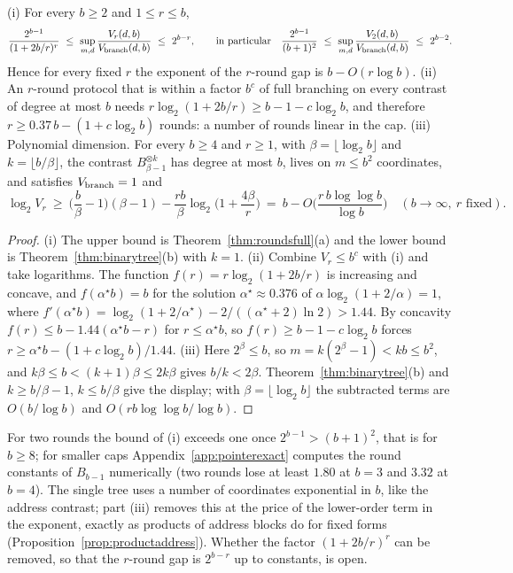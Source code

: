\begin{corollary}\label{cor:fewrounds}
\textup{(i)} For every $b\ge2$ and $1\le r\le b$,
\[
 \frac{2^{b-1}}{(1+2b/r)^{r}}\ \le\ \sup_{m,d}\frac{V_r(d,b)}{V_{\rm branch}(d,b)}\ \le\ 2^{b-r},
 \qquad\text{in particular}\quad
 \frac{2^{b-1}}{(b+1)^2}\ \le\ \sup_{m,d}\frac{V_2(d,b)}{V_{\rm branch}(d,b)}\ \le\ 2^{b-2}.
\]
Hence for every fixed $r$ the exponent of the $r$-round gap is $b-O(r\log b)$.
\textup{(ii)} An $r$-round protocol that is within a factor $b^{c}$ of full
branching on every contrast of degree at most $b$ needs
$r\log_2(1+2b/r)\ge b-1-c\log_2b$, and therefore $r\ge0.37\,b-(1+c\log_2b)$
rounds: a number of rounds linear in the cap.
\textup{(iii)} Polynomial dimension. For every $b\ge4$ and $r\ge1$, with
$\beta=\lfloor\log_2b\rfloor$ and $k=\lfloor b/\beta\rfloor$, the contrast
$B_{\beta-1}^{\otimes k}$ has degree at most $b$, lives on $m\le b^2$
coordinates, and satisfies $V_{\rm branch}=1$ and
\[
 \log_2V_r\ \ge\ \Big(\frac b\beta-1\Big)(\beta-1)-\frac{rb}{\beta}\log_2\Big(1+\frac{4\beta}{r}\Big)
 \ =\ b-O\Big(\frac{r\,b\log\log b}{\log b}\Big)\quad(b\to\infty,\ r\text{ fixed}).
\]
\end{corollary}
\begin{proof}
(i) The upper bound is Theorem~\ref{thm:roundsfull}(a) and the lower bound is
Theorem~\ref{thm:binarytree}(b) with $k=1$. (ii) Combine $V_r\le b^c$ with
(i) and take logarithms. The function $f(r)=r\log_2(1+2b/r)$ is increasing
and concave, and $f(\alpha^\star b)=b$ for the solution
$\alpha^\star\approx0.376$ of $\alpha\log_2(1+2/\alpha)=1$, where
$f'(\alpha^\star b)=\log_2(1+2/\alpha^\star)-2/((\alpha^\star+2)\ln2)>1.44$. By
concavity $f(r)\le b-1.44(\alpha^\star b-r)$ for $r\le\alpha^\star b$, so
$f(r)\ge b-1-c\log_2b$ forces
$r\ge\alpha^\star b-(1+c\log_2b)/1.44$. (iii) Here $2^\beta\le b$, so
$m=k(2^\beta-1)<kb\le b^2$, and $k\beta\le b<(k+1)\beta\le2k\beta$ gives
$b/k<2\beta$. Theorem~\ref{thm:binarytree}(b) and $k\ge b/\beta-1$,
$k\le b/\beta$ give the display; with $\beta=\lfloor\log_2b\rfloor$ the
subtracted terms are $O(b/\log b)$ and $O(rb\log\log b/\log b)$.
\end{proof}

For two rounds the bound of (i) exceeds one once $2^{b-1}>(b+1)^2$, that is
for $b\ge8$; for smaller caps Appendix~\ref{app:pointerexact} computes the
round constants of $B_{b-1}$ numerically (two rounds lose at least $1.80$ at
$b=3$ and $3.32$ at $b=4$). The single tree uses a number of coordinates
exponential in $b$, like the address contrast; part (iii) removes this at the
price of the lower-order term in the exponent, exactly as products of
address blocks do for fixed forms (Proposition~\ref{prop:productaddress}).
Whether the factor $(1+2b/r)^r$ can be removed, so that the $r$-round gap is
$2^{b-r}$ up to constants, is open.

